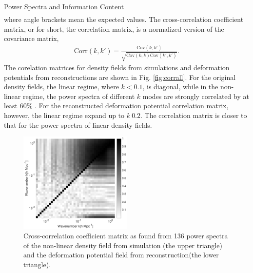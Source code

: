 \begin{section}{Power Spectra and Information Content}
\begin{align}
\end{align}
where angle brackets mean the expected values. 
    The cross-correlation coefficient matrix, or for short, the correlation matrix, is a normalized version of the covariance matrix,
\begin{align}
    \mathrm{Corr}\left(k,k'\right)=\frac{\mathrm{Cov}\left(k,k'\right)}{\sqrt{\mathrm{Cov}\left(k,k\right)\mathrm{Cov}\left(k',k'\right)}}.
\end{align}
The corelation matrices for density fields from simulations and deformation potentials from reconstructions are shown in Fig. \ref{fig:corrall}. For the original density fields, the linear regime, where $k<0.1$, is diagonal, while in the non-linear regime, the power spectra of different $k$ modes are strongly correlated by at least $60\%$ . For the reconstructed deformation potential correlation matrix, however, the linear regime expand up to $k~0.2$. The correlation matrix is closer to that for the power spectra of linear density fields.
\begin{figure}
 \centering
  \includegraphics[width=0.5\textwidth]{corr2-crop.pdf}
%
  \caption{Cross-correlation coefficient matrix as found from 136 power spectra of the non-linear density field from simulation (the upper triangle) and the deformation potential field from reconstruction(the lower triangle).}   


\end{figure}
\end{section}
